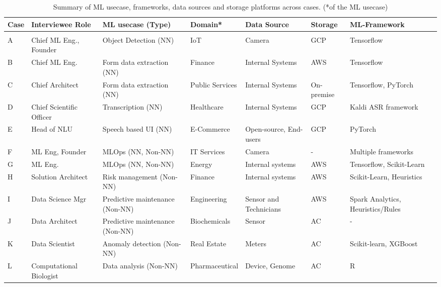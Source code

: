 

\begin{table*}[t]
 \centering
  \caption{Summary of ML usecase, frameworks, data sources and storage platforms across cases. (*of the ML usecase)}
  \begin{tabular}{p{}p{}p{3cm}p{}p{2cm}p{}p{}}
    \toprule
    \textbf{Case} & \textbf{Interviewee Role} & \textbf{ML usecase (Type)} & \textbf{Domain*} &\textbf{Data Source} & \textbf{Storage} & \textbf{ML-Framework} \\
    \toprule \\
    A & Chief ML Eng., Founder & Object Detection (NN) & IoT & Camera & GCP & Tensorflow \\
    B & Chief ML Eng. & Form data extraction  (NN) & Finance & Internal Systems & AWS & Tensorflow \\
    C & Chief Architect & Form data extraction (NN) & Public Services & Internal Systems & On-premise & Tensorflow, PyTorch \\
    D & Chief Scientific Officer & Transcription (NN) & Healthcare & Internal Systems & GCP & Kaldi ASR framework \\
    E & Head of NLU & Speech based UI (NN) & E-Commerce & Open-source, End-users & GCP & PyTorch \\
   F & ML Eng, Founder & MLOps (NN, Non-NN) & IT Services & Camera  & - & Multiple frameworks \\
    G & ML Eng. & MLOps (NN, Non-NN)  & Energy & Internal systems & AWS & Tensorflow, Scikit-Learn \\
    H & Solution Architect & Risk management (Non-NN) & Finance & Internal systems & AWS & Scikit-Learn, Heuristics \\
    I & Data Science Mgr & Predictive maintenance (Non-NN) & Engineering & Sensor and Technicians & AWS &  Spark Analytics, Heuristics/Rules \\
    J & Data Architect & Predictive maintenance (Non-NN) & Biochemicals & Sensor & AC & - \\
    K & Data Scientist & Anomaly detection (Non-NN) & Real Estate & Meters & AC & Scikit-learn, XGBoost \\
    L & Computational Biologist & Data analysis (Non-NN) & Pharmaceutical & Device,  Genome & AC & R \\

\end{tabular}
\end{table*}
